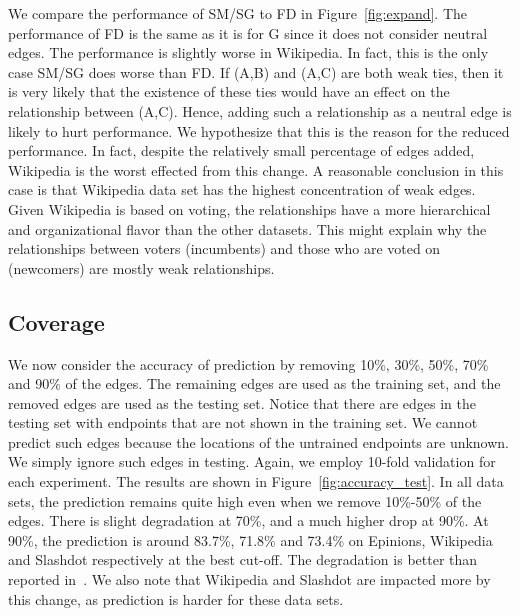 \documentclass[acmtweb]{acmsmall}
\begin{document}
We compare the performance of SM/SG to FD in
Figure~\ref{fig:expand}. The performance of FD is the same as it is
for G since it does not consider neutral edges. The performance is
slightly worse in Wikipedia. In fact, this is the only case SM/SG does
worse than FD. If (A,B) and (A,C) are both weak ties, then it is very
likely that the existence of these ties would have an effect on the
relationship between (A,C). Hence, adding such a relationship as a
neutral edge is likely to hurt performance. We hypothesize that this
is the reason for the reduced performance. In fact, despite the
relatively small percentage of edges added, Wikipedia is the worst
effected from this change. A reasonable conclusion in this case is
that Wikipedia data set has the highest concentration of weak edges.
Given Wikipedia is based on voting, the relationships have a more
hierarchical and organizational flavor than the other datasets. This
might explain why the relationships between voters (incumbents) and
those who are voted on (newcomers) are mostly weak relationships.


\subsection{Coverage} \label{sec:coverage}
We now consider the accuracy of prediction by removing 10\%, 30\%,
50\%, 70\% and 90\% of the edges. The remaining edges are used as the
training set, and the removed edges are used as the testing
set. Notice that there are edges in the testing set with endpoints
that are not shown in the training set. We cannot predict such edges
because the locations of the untrained endpoints are unknown. We
simply ignore such edges in testing. Again, we employ 10-fold
validation for each experiment. The results are shown in
Figure~\ref{fig:accuracy_test}. In all data sets, the prediction
remains quite high even when we remove 10\%-50\% of the edges. There
is slight degradation at 70\%, and a much higher drop at 90\%. At
90\%, the prediction is around 83.7\%, 71.8\% and 73.4\% on Epinions,
Wikipedia and Slashdot respectively at the best cut-off. The
degradation is better than reported in~\cite{golbeck:distrust2011}. We
also note that Wikipedia and Slashdot are impacted more by this
change, as prediction is harder for these data sets.
\end{document}

